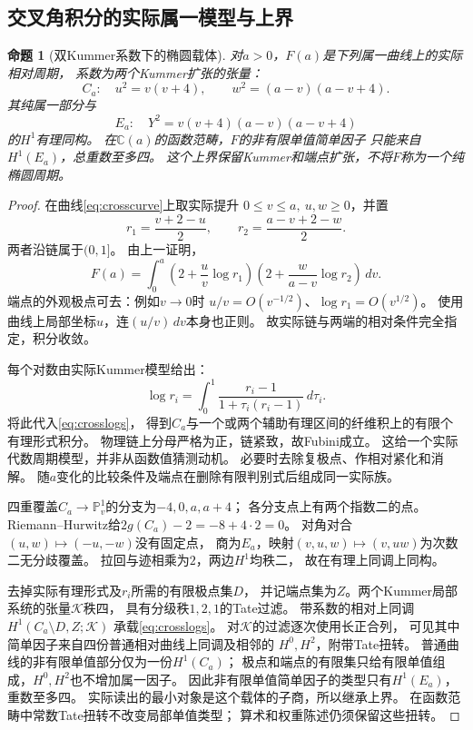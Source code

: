 \documentclass[11pt,a4paper]{ctexart}
\theoremstyle{cnplain}\newtheorem{theorem}{定理}[section]
\newtheorem{proposition}[theorem]{命题}
\theoremstyle{definition}\newtheorem{definition}[theorem]{定义}
\theoremstyle{remark}\newtheorem{remark}[theorem]{注}
\begin{document}
\subsection{交叉角积分的实际属一模型与上界}
\begin{proposition}[双Kummer系数下的椭圆载体]\label{prop:crosscarrier}
对$a>0$，$F(a)$是下列属一曲线上的实际相对周期，
系数为两个Kummer扩张的张量：
\begin{equation}\label{eq:crosscurve}
 C_a:\quad u^2=v(v+4),\qquad w^2=(a-v)(a-v+4).
\end{equation}
其纯属一部分与
\[
 E_a:\quad Y^2=v(v+4)(a-v)(a-v+4)
\]
的$H^1$有理同构。
在$\mathbb C(a)$的函数范畴，$F$的非有限单值简单因子
只能来自$H^1(E_a)$，总重数至多四。
这个上界保留Kummer和端点扩张，不将$F$称为一个纯椭圆周期。
\end{proposition}
\begin{proof}
在曲线\eqref{eq:crosscurve}上取实际提升
$0\le v\le a,\ u,w\ge0$，并置
\[
 r_1=\frac{v+2-u}{2},\qquad
 r_2=\frac{a-v+2-w}{2}.
\]
两者沿链属于$(0,1]$。
由上一证明，
\begin{equation}\label{eq:crosslogs}
 F(a)=\int_0^a
  \left(2+\frac uv\log r_1\right)
  \left(2+\frac w{a-v}\log r_2\right)\,dv .
\end{equation}
端点的外观极点可去：例如$v\to0$时
$u/v=O(v^{-1/2})$、$\log r_1=O(v^{1/2})$。
使用曲线上局部坐标$u$，连$ (u/v)\,dv$本身也正则。
故实际链与两端的相对条件完全指定，积分收敛。

每个对数由实际Kummer模型给出：
\[
 \log r_i=\int_0^1
       \frac{r_i-1}{1+\tau_i(r_i-1)}\,d\tau_i .
\]
将此代入\eqref{eq:crosslogs}，
得到$C_a$与一个或两个辅助有理区间的纤维积上的有限个有理形式积分。
物理链上分母严格为正，链紧致，故Fubini成立。
这给一个实际代数周期模型，并非从函数值猜测动机。
必要时去除复极点、作相对紧化和消解。
随$a$变化的比较条件及端点在删除有限判别式后组成同一实际族。

四重覆盖$C_a\to\mathbb P^1_v$的分支为$-4,0,a,a+4$；
各分支点上有两个指数二的点。
Riemann--Hurwitz给$2g(C_a)-2=-8+4\cdot2=0$。
对角对合$(u,w)\mapsto(-u,-w)$没有固定点，
商为$E_a$，映射$(v,u,w)\mapsto(v,uw)$为次数二无分歧覆盖。
拉回与迹相乘为$2$，两边$H^1$均秩二，
故在有理上同调上同构。

去掉实际有理形式及$r_i$所需的有限极点集$D$，
并记端点集为$Z$。两个Kummer局部系统的张量$\mathcal K$秩四，
具有分级秩$1,2,1$的Tate过滤。
带系数的相对上同调$H^1(C_a\setminus D,Z;\mathcal K)$
承载\eqref{eq:crosslogs}。
对$\mathcal K$的过滤逐次使用长正合列，
可见其中简单因子来自四份普通相对曲线上同调及相邻的
$H^0,H^2$，附带Tate扭转。
普通曲线的非有限单值部分仅为一份$H^1(C_a)$；
极点和端点的有限集只给有限单值组成，$H^0,H^2$也不增加属一因子。
因此非有限单值简单因子的类型只有$H^1(E_a)$，重数至多四。
实际读出的最小对象是这个载体的子商，所以继承上界。
在函数范畴中常数Tate扭转不改变局部单值类型；
算术和权重陈述仍须保留这些扭转。
\end{proof}
\end{document}
